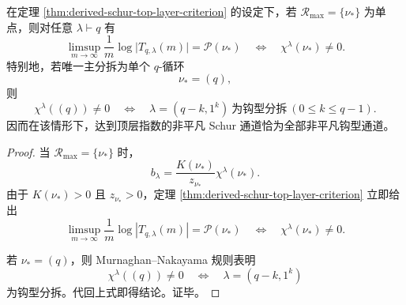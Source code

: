 
\begin{corollary}[唯一主分拆时的角色选择律]\label{cor:derived-schur-unique-dominant-partition-selection}
在定理 \ref{thm:derived-schur-top-layer-criterion} 的设定下，若 \(\mathcal R_{\max}=\{\nu_*\}\) 为单点，则对任意 \(\lambda\vdash q\) 有
\[
\limsup_{m\to\infty}\frac1m\log\bigl|T_{q,\lambda}(m)\bigr|
=
\mathcal P(\nu_*)
\quad\Longleftrightarrow\quad
\chi^\lambda(\nu_*)\neq 0.
\]
特别地，若唯一主分拆为单个 \(q\)-循环
\[
\nu_*=(q),
\]
则
\[
\chi^\lambda((q))\neq 0
\quad\Longleftrightarrow\quad
\lambda=(q-k,1^k)\ \text{为钩型分拆}\ (0\le k\le q-1).
\]
因而在该情形下，达到顶层指数的非平凡 Schur 通道恰为全部非平凡钩型通道。
\end{corollary}
\begin{proof}
当 \(\mathcal R_{\max}=\{\nu_*\}\) 时，
\[
b_\lambda=\frac{K(\nu_*)}{z_{\nu_*}}\chi^\lambda(\nu_*).
\]
由于 \(K(\nu_*)>0\) 且 \(z_{\nu_*}>0\)，定理 \ref{thm:derived-schur-top-layer-criterion} 立即给出
\[
\limsup_{m\to\infty}\frac1m\log|T_{q,\lambda}(m)|=\mathcal P(\nu_*)
\quad\Longleftrightarrow\quad
\chi^\lambda(\nu_*)\neq 0.
\]

若 \(\nu_*=(q)\)，则 Murnaghan--Nakayama 规则表明
\[
\chi^\lambda((q))\neq 0
\quad\Longleftrightarrow\quad
\lambda=(q-k,1^k)
\]
为钩型分拆。代回上式即得结论。证毕。
\end{proof}

